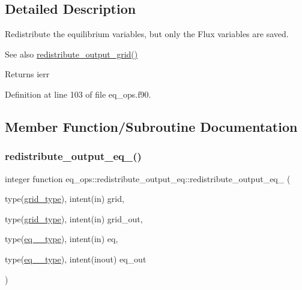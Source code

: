 \subsection{Detailed Description}
Redistribute the equilibrium variables, but only the Flux variables are saved. 

\begin{DoxySeeAlso}{See also}
\hyperlink{namespacegrid__ops_ab10ef5b486ee3861df2da4e53bc22630}{redistribute\+\_\+output\+\_\+grid()}
\end{DoxySeeAlso}
\begin{DoxyReturn}{Returns}
ierr 
\end{DoxyReturn}


Definition at line 103 of file eq\+\_\+ops.\+f90.



\subsection{Member Function/\+Subroutine Documentation}
\mbox{\label{interfaceeq__ops_1_1redistribute__output__eq_ac77911cf8c4631896ad2d0fff66e6893}} 
\subsubsection{\texorpdfstring{redistribute\+\_\+output\+\_\+eq\+\_()}{redistribute\_output\_eq\_1()}\hspace{0.1cm}{\footnotesize\ttfamily [1/2]}}
{\footnotesize\ttfamily integer function eq\+\_\+ops\+::redistribute\+\_\+output\+\_\+eq\+::redistribute\+\_\+output\+\_\+eq\+\_ (\begin{DoxyParamCaption}\item[{type(\hyperlink{structgrid__vars_1_1grid__type}{grid\+\_\+type}), intent(in)}]{grid,  }\item[{type(\hyperlink{structgrid__vars_1_1grid__type}{grid\+\_\+type}), intent(in)}]{grid\+\_\+out,  }\item[{type(\hyperlink{structeq__vars_1_1eq__1__type}{eq\+\_\+1\+\_\+type}), intent(in)}]{eq,  }\item[{type(\hyperlink{structeq__vars_1_1eq__1__type}{eq\+\_\+1\+\_\+type}), intent(inout)}]{eq\+\_\+out }\end{DoxyParamCaption})}



